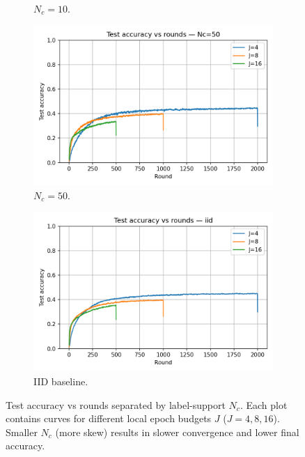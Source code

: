\documentclass[10pt,twocolumn,letterpaper]{article}
\begin{document}
\begin{figure}[H]
\begin{subfigure}[b]{0.32\linewidth}
    \caption{\(N_c=10\).}
  \end{subfigure}

  \vspace{2mm}

  \begin{subfigure}[b]{0.48\linewidth}
    \centering
    \includegraphics[width=\linewidth]{heter_figs/acc_vs_rounds_Nc_50.png}
    \caption{\(N_c=50\).}
  \end{subfigure}
  \hfill
  \begin{subfigure}[b]{0.48\linewidth}
    \centering
    \includegraphics[width=\linewidth]{heter_figs/acc_vs_rounds_iid.png}
    \caption{IID baseline.}
  \end{subfigure}

  \caption{Test accuracy vs rounds separated by label-support \(N_c\). Each plot contains curves for different local epoch budgets \(J\) (\(J=4,8,16\)). Smaller \(N_c\) (more skew) results in slower convergence and lower final accuracy. \cite{hsu2019measuring,li2018federated,karimireddy2020scaffold}}
  \label{fig:hetero-acc-perNc}
\end{figure}
\end{document}

